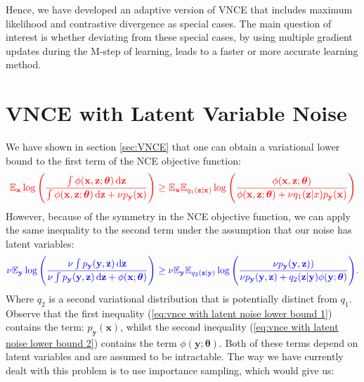 \documentclass[11pt, oneside]{article}
\newcommand{\thetab}{{\boldsymbol{\theta}}}
\newcommand{\pnn}{\phi}
\newcommand{\pnoise}{p_{ \mathbf y}}
\newcommand{\x}{{\mathbf x}}
\newcommand{\y}{{\mathbf y}}
\newcommand{\z}{{\mathbf z}}
\newcommand{\E}{\mathbb{E}}
\newcommand{\Ex}{\E_{\x}}
\newcommand{\Ey}{\E_{\y}}
\theoremstyle{definition}
\begin{document}
{Hence, we have developed an adaptive version of VNCE that includes maximum likelihood and contrastive divergence as special cases. The main question of interest is whether deviating from these special cases, by using multiple gradient updates during the M-step of learning, leads to a faster or more accurate learning method.

\section{VNCE with Latent Variable Noise}
\label{sec:vnce with latent variable noise}
We have shown in section \ref{sec:VNCE} that one can obtain a variational lower bound to the first term of the NCE objective function:
\begin{align}
\label{eq:vnce with latent noise lower bound 1}
    \color{red}{\Ex  \log \left(\frac{\int \pnn(\x, \z;\thetab) \dif \z}{\int \pnn(\x, \z;\thetab) \dif \z + \nu \pnoise(\x)}\right)}
    \geq  \color{red}{\Ex \mathbb{E}_{q_1(\z | \x)} \log \left( \frac{\pnn(\x,\z; \thetab)}{\pnn(\x,\z; \thetab) + \nu q_1(\z |x)\pnoise(\x)} \right)}
\end{align}
However, because of the symmetry in the NCE objective function, we can apply the same inequality to the second term under the assumption that our noise has latent variables:
\begin{align}
\label{eq:vnce with latent noise lower bound 2}
    \color{blue}{\nu \Ey  \log \left(\frac{ \nu \int \pnoise(\y, \z) \dif \z}{\nu \int \pnoise(\y, \z) \dif \z + \pnn(\x ; \thetab)} \right)}
    \geq  \color{blue}{ \nu \Ey \mathbb{E}_{q_2(\z | \y)} \log \left( \frac{\nu \pnoise(\y, \z))}{\nu \pnoise(\y, \z) +  q_2(\z | \y) \pnn(\y ; \thetab) } \right)}.
\end{align}
Where $q_2$ is a second variational distribution that is potentially distinct from $q_1$. Observe that the first inequality (\ref{eq:vnce with latent noise lower bound 1}) contains the term: $\pnoise(\x)$, whilst the second inequality (\ref{eq:vnce with latent noise lower bound 2}) contains the term $\pnn(\y; \thetab)$. Both of these terms depend on latent variables and are assumed to be intractable. The way we have currently dealt with this problem is to use importance sampling, which would give us:
}
\end{document}
